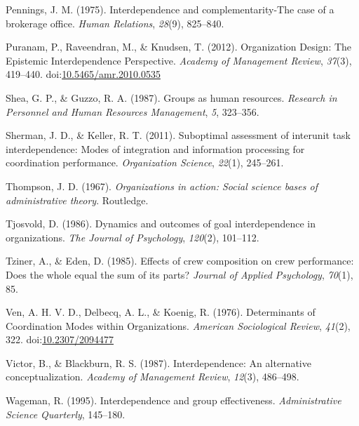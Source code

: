 \documentclass[english,,man]{apa6}
\theoremstyle{definition}
\theoremstyle{definition}
\theoremstyle{definition}
\theoremstyle{remark}
\begin{document}
\leavevmode\hypertarget{ref-pennings_interdependence_1975}{}%
Pennings, J. M. (1975). Interdependence and complementarity-The case of
a brokerage office. \emph{Human Relations}, \emph{28}(9), 825--840.

\leavevmode\hypertarget{ref-puranam_organization_2012}{}%
Puranam, P., Raveendran, M., \& Knudsen, T. (2012). Organization Design:
The Epistemic Interdependence Perspective. \emph{Academy of Management
Review}, \emph{37}(3), 419--440.
doi:\href{https://doi.org/10.5465/amr.2010.0535}{10.5465/amr.2010.0535}

\leavevmode\hypertarget{ref-shea1987groups}{}%
Shea, G. P., \& Guzzo, R. A. (1987). Groups as human resources.
\emph{Research in Personnel and Human Resources Management}, \emph{5},
323--356.

\leavevmode\hypertarget{ref-sherman_suboptimal_2011-1}{}%
Sherman, J. D., \& Keller, R. T. (2011). Suboptimal assessment of
interunit task interdependence: Modes of integration and information
processing for coordination performance. \emph{Organization Science},
\emph{22}(1), 245--261.

\leavevmode\hypertarget{ref-thompson2017organizations}{}%
Thompson, J. D. (1967). \emph{Organizations in action: Social science
bases of administrative theory}. Routledge.

\leavevmode\hypertarget{ref-tjosvold_dynamics_1986}{}%
Tjosvold, D. (1986). Dynamics and outcomes of goal interdependence in
organizations. \emph{The Journal of Psychology}, \emph{120}(2),
101--112.

\leavevmode\hypertarget{ref-tziner1985effects}{}%
Tziner, A., \& Eden, D. (1985). Effects of crew composition on crew
performance: Does the whole equal the sum of its parts? \emph{Journal of
Applied Psychology}, \emph{70}(1), 85.

\leavevmode\hypertarget{ref-ven_determinants_1976}{}%
Ven, A. H. V. D., Delbecq, A. L., \& Koenig, R. (1976). Determinants of
Coordination Modes within Organizations. \emph{American Sociological
Review}, \emph{41}(2), 322.
doi:\href{https://doi.org/10.2307/2094477}{10.2307/2094477}

\leavevmode\hypertarget{ref-victor_interdependence_1987}{}%
Victor, B., \& Blackburn, R. S. (1987). Interdependence: An alternative
conceptualization. \emph{Academy of Management Review}, \emph{12}(3),
486--498.

\leavevmode\hypertarget{ref-wageman_interdependence_1995}{}%
Wageman, R. (1995). Interdependence and group effectiveness.
\emph{Administrative Science Quarterly}, 145--180.
\end{document}
